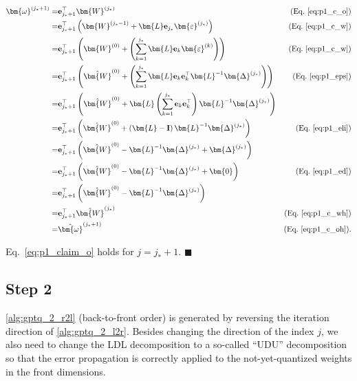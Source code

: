 \documentclass{article} %
\begin{document}
\begin{equation}
\begin{aligned}
\bm{\omega}^{(j_*+1)} = & \mathbf{e}_{j_*+1}^\top \bm{W}^{(j_*)}  & \text{(Eq.~\ref{eq:p1_c_o})} \\
= & \mathbf{e}_{j_*+1}^\top \left( \bm{W}^{(j_*-1)} + \bm{L} \mathbf{e}_{j_*} \bm{\varepsilon}^{(j_*)} \right) & \text{(Eq.~\ref{eq:p1_c_w})} \\
= & \mathbf{e}_{j_*+1}^\top \left( \bm{W}^{(0)} + \left( \sum_{k=1}^{j_*} \bm{L} \mathbf{e}_{k} \bm{\varepsilon}^{(k)} \right) \right) & \text{(Eq.~\ref{eq:p1_c_w})} \\
= & \mathbf{e}_{j_*+1}^\top \left( \hat{\bm{W}}^{(0)} + \left( \sum_{k=1}^{j_*} \bm{L} \mathbf{e}_{k} \mathbf{e}_{k}^\top \bm{L}^{-1} \bm{\Delta}^{(j_*)} \right) \right) & \text{(Eq.~\ref{eq:p1_eps})} \\
= & \mathbf{e}_{j_*+1}^\top \left( \hat{\bm{W}}^{(0)} + \bm{L} \left( \sum_{k=1}^{j_*} \mathbf{e}_{k} \mathbf{e}_{k}^\top \right) \bm{L}^{-1} \bm{\Delta}^{(j_*)} \right) \\
= & \mathbf{e}_{j_*+1}^\top \left( \hat{\bm{W}}^{(0)} + \left( \bm{L} - \mathbf{I} \right) \bm{L}^{-1} \bm{\Delta}^{(j_*)} \right) & \text{(Eq.~\ref{eq:p1_eli})} \\
= & \mathbf{e}_{j_*+1}^\top \left( \hat{\bm{W}}^{(0)} - \bm{L}^{-1} \bm{\Delta}^{(j_*)} + \bm{\Delta}^{(j_*)} \right) \\
= & \mathbf{e}_{j_*+1}^\top \left( \hat{\bm{W}}^{(0)} - \bm{L}^{-1} \bm{\Delta}^{(j_*)} + \bm{0} \right) & \text{(Eq.~\ref{eq:p1_ed})} \\
= & \mathbf{e}_{j_*+1}^\top \left( \hat{\bm{W}}^{(0)} - \bm{L}^{-1} \bm{\Delta}^{(j_*)} \right) \\
= & \mathbf{e}_{j_*+1}^\top \hat{\bm{W}}^{(j_*)} & \text{(Eq.~\ref{eq:p1_c_wh})} \\
= & \hat{\bm{\omega}}^{(j_*+1)}  & \text{(Eq.~\ref{eq:p1_c_oh})} .
\end{aligned}
\end{equation}

Eq.~\ref{eq:p1_claim_o} holds for $j = j_* + 1$.
\hfill $\blacksquare$

\subsection{Step 2}
\label{sec:app_proof_gptq_babai_step_2}

\cref{alg:gptq_2_r2l} (back-to-front order) is generated by reversing the iteration direction of \cref{alg:gptq_2_l2r}. Besides changing the direction of the index $j$, we also need to change the LDL decomposition to a so-called ``UDU'' decomposition so that the error propagation is correctly applied to the not-yet-quantized weights in the front dimensions.
\end{document}
